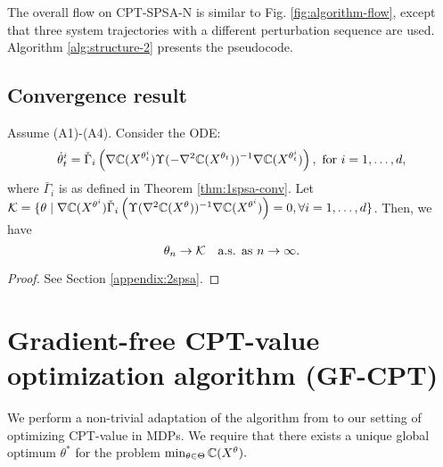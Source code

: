 \documentclass[11pt,letterpaper,english]{article}
\begin{document}
The overall flow on CPT-SPSA-N is similar to Fig. \ref{fig:algorithm-flow}, except that three system trajectories with a different perturbation sequence are used. Algorithm \ref{alg:structure-2} presents the pseudocode.  

\subsection{Convergence result}
\begin{theorem}
\label{thm:2spsa}
Assume (A1)-(A4). 
Consider the ODE: 
$$
\dot\theta^{i}_t = \check\Gamma_{i}\left( \nabla \mathbb{C}(X^{\theta^{i}_t}) \Upsilon(-\nabla^2 \mathbb{C}(X^{\theta_t}))^{-1} \nabla \mathbb{C}(X^{\theta^{i}_t}) \right), \text { for }i=1,\dots,d,$$
where 
$\bar\Gamma_{i}$ is as defined in Theorem \ref{thm:1spsa-conv}. Let $\mathcal{K} = \{\theta \mid
\nabla \mathbb{C}(X^{\theta^{i}})  \check\Gamma_{i}\left(\Upsilon(\nabla^2 \mathbb{C}(X^{\theta}))^{-1} \nabla \mathbb{C}(X^{\theta^{i}})\right)
=0, \forall i=1,\ldots,d\}$. Then,
we have
$$\theta_n \rightarrow \mathcal{K}  \text{~~ a.s. as } n\rightarrow \infty.$$ 
\end{theorem}
\begin{proof}
 See Section \ref{appendix:2spsa}.
\end{proof}

\section{Gradient-free CPT-value optimization algorithm (GF-CPT)}
\label{sec:mras}
We perform a non-trivial adaptation of the algorithm from \cite{chang2013simulation} to our setting of optimizing CPT-value in MDPs.
We require that there exists a unique global optimum $\theta^*$ for the problem $\min_{\theta \in \Theta} \mathbb{C}(X^\theta).$
\end{document}
